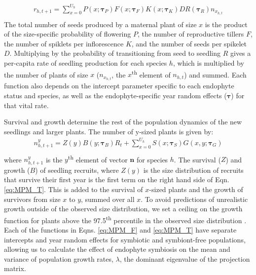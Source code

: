 \documentclass[12pt]{article}
\begin{document}
\begin{equation} 
	\label{eq:MPM_F}
	\begin{aligned}
		r_{h,t+1} = \sum_{x=0}^{U_{h}} P(x; \pmb{\tau}_{P})F(x; \pmb{\tau}_{F})K(x; \pmb{\tau}_{K})DR(\pmb{\tau}_{R}) n_{x_{h,t}}\\
	\end{aligned}
\end{equation}
The total number of seeds produced by a maternal plant of size $x$ is the product of the size-specific probability of flowering $P$, the number of reproductive tillers $F$, the number of spiklets per inflorescence $K$, and the number of seeds per spikelet $D$. 
Multiplying by the probability of transitioning from seed to seedling $R$ gives a per-capita rate of seedling production for each species $h$, which is multiplied by the number of plants of size $x$ ($n_{x_{h,t}}$, the $x$\textsuperscript{th} element of $n_{h,t}$) and summed.  
Each function also depends on the intercept parameter specific to each endophyte status and species, as well as the endophyte-specific year random effects  ($\pmb{\tau}$) for that vital rate. 

Survival and growth determine the rest of the population dynamics of the new seedlings and larger plants. 
The number of y-sized plants is given by:
\begin{equation} 
	\label{eq:MPM_T}
	\begin{aligned}
		n^y_{h,t+1} = Z(y)B(y; \pmb{\tau}_{B})R_{t}  + 
		\sum_{x=0}^{U_{h}} S(x; \pmb{\tau}_{S})G(x,y; \pmb{\tau}_{G})\\
	\end{aligned}
\end{equation}
where $n^y_{h,t+1}$ is the $y$\textsuperscript{th} element of vector $\textbf{n}$ for species $h$.
The survival ($Z$) and growth ($B$) of seedling recruits, where $Z(y)$ is the size distribution of recruits that survive their first year is the first term on the right hand side of Eqn. \ref{eq:MPM_T}. 
This is added to the survival of $x$-sized plants and the growth of survivors from size $x$ to $y$, summed over all $x$. 
To avoid predictions of unrealistic growth outside of the observed size distribution, we set a ceiling on the growth function for plants above the 97.5\textsuperscript{th} percentile in the observed size distribution \cite{williams2012avoiding}.
Each of the functions in Eqns. \ref{eq:MPM_F} and \ref{eq:MPM_T} have separate intercepts and year random effects for symbiotic and symbiont-free populations, allowing us to calculate the effect of endophyte symbiosis on the mean and variance of population growth rates, $\lambda$, the dominant eigenvalue of the projection matrix.
\end{document}
